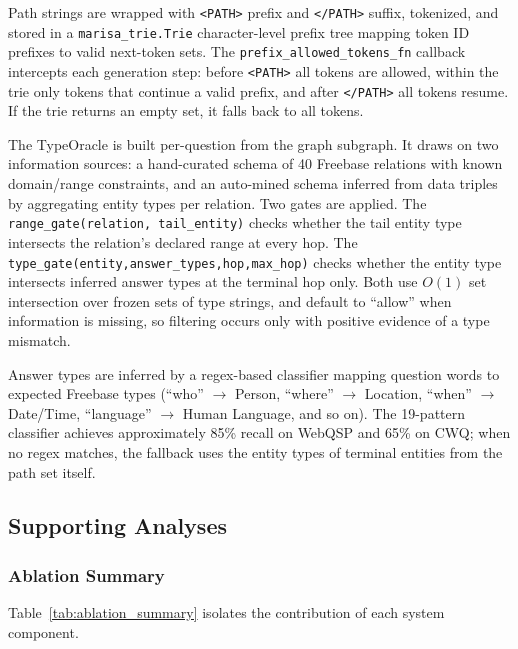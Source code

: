 Path strings are wrapped with \texttt{<PATH>} prefix and \texttt{</PATH>} suffix, tokenized, and stored in a \texttt{marisa\_trie.Trie} character-level prefix tree mapping token ID prefixes to valid next-token sets. The \texttt{prefix\_allowed\_tokens\_fn} callback intercepts each generation step: before \texttt{<PATH>} all tokens are allowed, within the trie only tokens that continue a valid prefix, and after \texttt{</PATH>} all tokens resume. If the trie returns an empty set, it falls back to all tokens.

The TypeOracle is built per-question from the graph subgraph. It draws on two information sources: a hand-curated schema of 40 Freebase relations with known domain/range constraints, and an auto-mined schema inferred from data triples by aggregating entity types per relation. Two gates are applied. The \texttt{range\_gate(relation, tail\_entity)} checks whether the tail entity type intersects the relation's declared range at every hop. The \texttt{type\_gate(entity,\allowbreak answer\_types,\allowbreak hop,\allowbreak max\_hop)} checks whether the entity type intersects inferred answer types at the terminal hop only. Both use $O(1)$ set intersection over frozen sets of type strings, and default to ``allow'' when information is missing, so filtering occurs only with positive evidence of a type mismatch.

Answer types are inferred by a regex-based classifier mapping question words to expected Freebase types (``who'' $\to$ Person, ``where'' $\to$ Location, ``when'' $\to$ Date/Time, ``language'' $\to$ Human Language, and so on). The 19-pattern classifier achieves approximately 85\% recall on WebQSP and 65\% on CWQ; when no regex matches, the fallback uses the entity types of terminal entities from the path set itself.

\subsection{Supporting Analyses}
\label{sec:ch4support}

\subsubsection{Ablation Summary}

Table~\ref{tab:ablation_summary} isolates the contribution of each system component.

